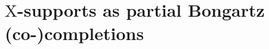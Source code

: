 \documentclass[11pt,reqno]{amsart}
\theoremstyle{plain}
\theoremstyle{definition}
\numberwithin{equation}{section}
\newcommand\RR{\mathbb{R}}
\newcommand\<{\langle}
\renewcommand\>{\rangle}
\renewcommand{\emptyset}{\varnothing}
\newcommand{\CEG}{\operatorname{CEG}} %
\newcommand{\uCEG}{\underline{\CEG}} %
\newcommand{\on}[1]{\operatorname{#1}}
\def\CCx{\on{Cpx}}   %
\def\cc{\on{cell}}  %
\def\Star{\on{Star}}    %
\def\link{\on{Link}}    %
\def\vv{\mathbf{v}}
\def\sink{X}
\newcommand{\ccpt}[1]{\mathrm{#1}}%
\def\xevo{\ccpt{X}}%
\newcommand{\ubf}[1]{\underline{\mathbf{#1}}}
\def\seeds{\mathbf{\Sigma}}
\def\supp{\on{supp}}
\def\dCpx{\overrightarrow{\CCx}}
\begin{document}






\section{\texorpdfstring{$\xevo$-supports as partial Bongartz (co-)completions}{X-supports and partial Bongartz (co-)completions}}\label{sec:suppBgz}
\end{document}
